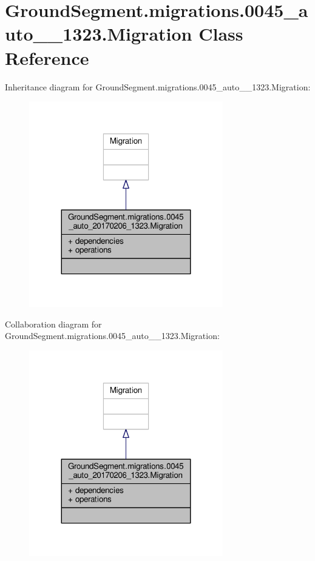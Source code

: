 \hypertarget{class_ground_segment_1_1migrations_1_10045__auto__20170206__1323_1_1_migration}{}\section{Ground\+Segment.\+migrations.0045\+\_\+auto\+\_\+\_\+1323.Migration Class Reference}
\label{class_ground_segment_1_1migrations_1_10045__auto__20170206__1323_1_1_migration}


Inheritance diagram for Ground\+Segment.\+migrations.0045\+\_\+auto\+\_\+\_\+1323.Migration\+:\nopagebreak
\begin{figure}[H]
\begin{center}
\leavevmode
\includegraphics[width=239pt]{class_ground_segment_1_1migrations_1_10045__auto__20170206__1323_1_1_migration__inherit__graph}
\end{center}
\end{figure}


Collaboration diagram for Ground\+Segment.\+migrations.0045\+\_\+auto\+\_\+\_\+1323.Migration\+:\nopagebreak
\begin{figure}[H]
\begin{center}
\leavevmode
\includegraphics[width=239pt]{class_ground_segment_1_1migrations_1_10045__auto__20170206__1323_1_1_migration__coll__graph}
\end{center}
\end{figure}
